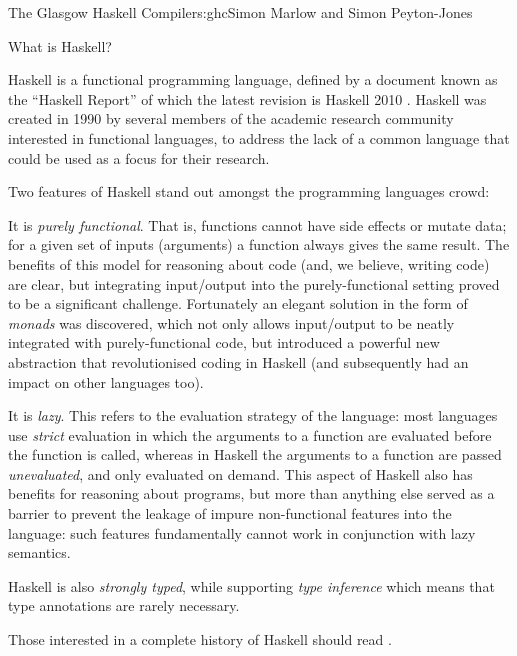 \begin{aosachapter}{The Glasgow Haskell Compiler}{s:ghc}{Simon Marlow and Simon Peyton-Jones}
\begin{aosasect1}{What is Haskell?}

Haskell is a functional programming language, defined by a document
known as the ``Haskell Report'' of which the latest revision is
Haskell 2010 \cite{bib:haskell2010}.  Haskell was created in 1990 by
several members of the academic research community interested in
functional languages, to address the lack of a common language that
could be used as a focus for their research.

Two features of Haskell stand out amongst the programming languages
crowd:

\begin{aosaitemize}

\item It is \emph{purely functional}.  That is, functions cannot have
  side effects or mutate data; for a given set of inputs (arguments) a
  function always gives the same result.  The benefits of this model
  for reasoning about code (and, we believe, writing code) are clear,
  but integrating input/output into the purely-functional setting
  proved to be a significant challenge.  Fortunately an elegant
  solution in the form of \emph{monads} was discovered, which not only
  allows input/output to be neatly integrated with purely-functional
  code, but introduced a powerful new abstraction that revolutionised
  coding in Haskell (and subsequently had an impact on other languages
  too).

\item It is \emph{lazy}.  This refers to the evaluation strategy of
  the language: most languages use \emph{strict} evaluation in which
  the arguments to a function are evaluated before the function is
  called, whereas in Haskell the arguments to a function are passed
  \emph{unevaluated}, and only evaluated on demand.  This aspect of
  Haskell also has benefits for reasoning about programs, but more
  than anything else served as a barrier to prevent the leakage of
  impure non-functional features into the language: such features
  fundamentally cannot work in conjunction with lazy semantics.

\end{aosaitemize}

Haskell is also \emph{strongly typed}, while supporting \emph{type
  inference} which means that type annotations are rarely necessary.

Those interested in a complete history of Haskell should read
\cite{bib:haskellhistory}.


\end{aosasect1}
\end{aosachapter}

